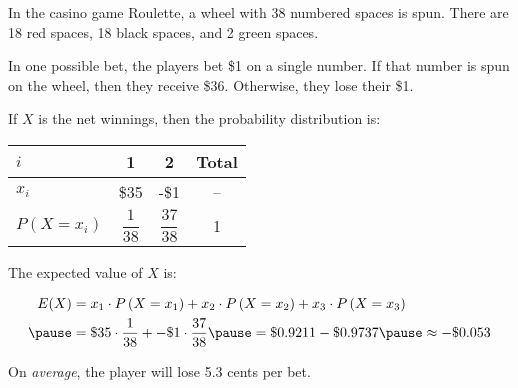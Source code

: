 \documentclass{beamer}
\newcommand{\prob}[1]{P\left({#1}\right)}
\begin{document}
\begin{frame}
\begin{example}
In the casino game Roulette, a wheel with 38 numbered spaces is spun. There are 18 red spaces, 18 black spaces, and 2 green spaces. \pause

\vspace{1mm}
In one possible bet, the players bet \$1 on a single number. If that number is spun on the wheel, then they receive \$36. Otherwise, they lose their \$1.\pause

\vspace{1mm}
If $X$ is the net winnings, then the probability distribution is:
\begin{center}
\begin{tabular}{lccc} \hline
$i$ & 1 & 2 & Total \\\hline
$x_i$ & \$35 & -\$1 & -- \\
$\prob{X=x_i}$ & $\dfrac{1}{38}$ & $\dfrac{37}{38}$ & 1\\[2mm]\hline
\end{tabular}
\end{center}\pause

The expected value of $X$ is:

\vspace{-2mm}
\begin{equation*}
\begin{aligned}
E(X) &= x_1\cdot\prob{X=x_1} + x_2\cdot\prob{X=x_2} + x_3\cdot\prob{X=x_3} \\\pause
&= \$35\cdot\dfrac{1}{38} + -\$1\cdot\dfrac{37}{38} \pause = \$0.9211 - \$0.9737 \pause \approx -\$0.053
\end{aligned}
\end{equation*}\pause

\vspace{-3mm}
On \emph{average}, the player will lose 5.3 cents per bet.
\end{example}
\end{frame}
\end{document}

